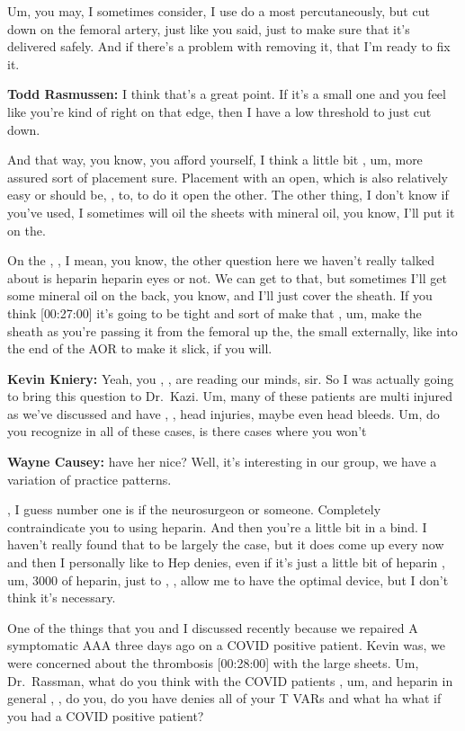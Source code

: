 \documentclass[
]{book}
\begin{document}
Um, you may, I sometimes consider, I use do a most percutaneously, but
cut down on the femoral artery, just like you said, just to make sure
that it's delivered safely. And if there's a problem with removing it,
that I'm ready to fix it.

\textbf{Todd Rasmussen:} I think that's a great point. If it's a small one
and you feel like you're kind of right on that edge, then I have a low
threshold to just cut down.

And that way, you know, you afford yourself, I think a little bit , um,
more assured sort of placement sure. Placement with an open, which is
also relatively easy or should be, , to, to do it open the other. The
other thing, I don't know if you've used, I sometimes will oil the
sheets with mineral oil, you know, I'll put it on the.

On the , , I mean, you know, the other question here we haven't really
talked about is heparin heparin eyes or not. We can get to that, but
sometimes I'll get some mineral oil on the back, you know, and I'll just
cover the sheath. If you think {[}00:27:00{]} it's going to be tight and
sort of make that , um, make the sheath as you're passing it from the
femoral up the, the small externally, like into the end of the AOR to
make it slick, if you will.

\textbf{Kevin Kniery:} Yeah, you , , are reading our minds, sir. So I was
actually going to bring this question to Dr.~Kazi. Um, many of these
patients are multi injured as we've discussed and have , , head
injuries, maybe even head bleeds. Um, do you recognize in all of these
cases, is there cases where you won't

\textbf{Wayne Causey:} have her nice? Well, it's interesting in our group, we
have a variation of practice patterns.

, I guess number one is if the neurosurgeon or someone. Completely
contraindicate you to using heparin. And then you're a little bit in a
bind. I haven't really found that to be largely the case, but it does
come up every now and then I personally like to Hep denies, even if it's
just a little bit of heparin , um, 3000 of heparin, just to , , allow me
to have the optimal device, but I don't think it's necessary.

One of the things that you and I discussed recently because we repaired
A symptomatic AAA three days ago on a COVID positive patient. Kevin was,
we were concerned about the thrombosis {[}00:28:00{]} with the large sheets.
Um, Dr.~Rassman, what do you think with the COVID patients , um, and
heparin in general , , do you, do you have denies all of your T VARs and
what ha what if you had a COVID positive patient?
\end{document}

